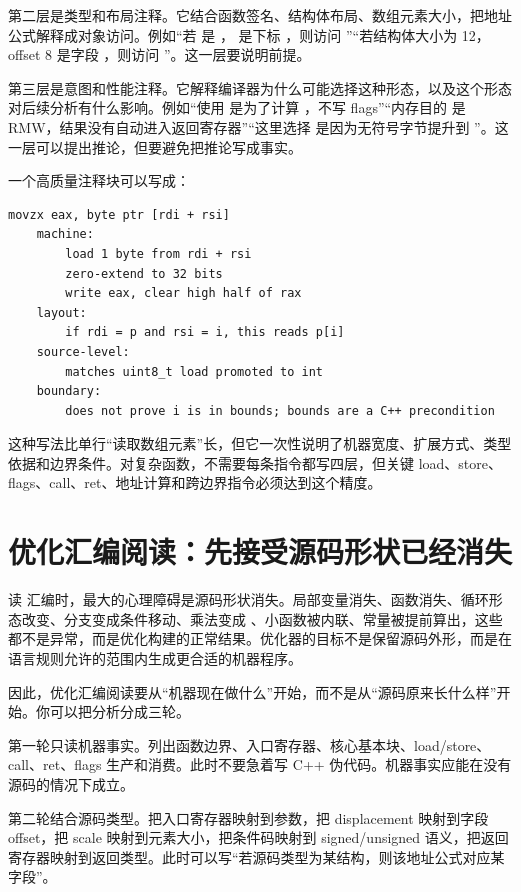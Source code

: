 第二层是类型和布局注释。它结合函数签名、结构体布局、数组元素大小，把地址公式解释成对象访问。例如“若  是 ， 是下标 ，则访问 ”“若结构体大小为 12，offset 8 是字段 ，则访问 ”。这一层要说明前提。

第三层是意图和性能注释。它解释编译器为什么可能选择这种形态，以及这个形态对后续分析有什么影响。例如“使用  是为了计算 ，不写 flags”“内存目的  是 RMW，结果没有自动进入返回寄存器”“这里选择  是因为无符号字节提升到 ”。这一层可以提出推论，但要避免把推论写成事实。

一个高质量注释块可以写成：

\begin{lstlisting}
movzx eax, byte ptr [rdi + rsi]
    machine:
        load 1 byte from rdi + rsi
        zero-extend to 32 bits
        write eax, clear high half of rax
    layout:
        if rdi = p and rsi = i, this reads p[i]
    source-level:
        matches uint8_t load promoted to int
    boundary:
        does not prove i is in bounds; bounds are a C++ precondition
\end{lstlisting}

这种写法比单行“读取数组元素”长，但它一次性说明了机器宽度、扩展方式、类型依据和边界条件。对复杂函数，不需要每条指令都写四层，但关键 load、store、flags、call、ret、地址计算和跨边界指令必须达到这个精度。

\section{优化汇编阅读：先接受源码形状已经消失}

读  汇编时，最大的心理障碍是源码形状消失。局部变量消失、函数消失、循环形态改变、分支变成条件移动、乘法变成 、小函数被内联、常量被提前算出，这些都不是异常，而是优化构建的正常结果。优化器的目标不是保留源码外形，而是在语言规则允许的范围内生成更合适的机器程序。

因此，优化汇编阅读要从“机器现在做什么”开始，而不是从“源码原来长什么样”开始。你可以把分析分成三轮。

第一轮只读机器事实。列出函数边界、入口寄存器、核心基本块、load/store、call、ret、flags 生产和消费。此时不要急着写 C++ 伪代码。机器事实应能在没有源码的情况下成立。

第二轮结合源码类型。把入口寄存器映射到参数，把 displacement 映射到字段 offset，把 scale 映射到元素大小，把条件码映射到 signed/unsigned 语义，把返回寄存器映射到返回类型。此时可以写“若源码类型为某结构，则该地址公式对应某字段”。

